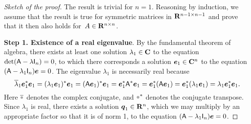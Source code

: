 \begin{proof}
    [Sketch of the proof]
    The result is trivial for $n = 1$.
    Reasoning by induction,
    we assume that the result is true for symmetric matrices in $\mathbf R^{n-1 \times n-1}$
    and prove that it then also holds for~$A \in \mathbf R^{n \times n}$.

            \vspace{.3cm}
            \textbf{Step 1. Existence of a real eigenvalue}.
            By the fundamental theorem of algebra,
            there exists at least one solution $\lambda_1 \in \mathbf C$ to the equation $\det(\mathsf A - \lambda \mathsf I_n) = 0$,
            to which there corresponds a solution $\mathbf{\boldsymbol{e}}_1 \in \mathbf C^n$ to the equation $(\mathsf A - \lambda_1 \mathsf I_n) \mathbf{\boldsymbol{e}} = 0$.
            The eigenvalue $\lambda_1$ is necessarily real because
            \[
                \overline \lambda_1 \mathbf{\boldsymbol{e}}_1^* \mathbf{\boldsymbol{e}}_1
                = (\lambda_1 \mathbf{\boldsymbol{e}}_1)^* \mathbf{\boldsymbol{e}}_1
                = (\mathsf A \mathbf{\boldsymbol{e}}_1)^* \mathbf{\boldsymbol{e}}_1
                = \mathbf{\boldsymbol{e}}_1^* \mathsf A^* \mathbf{\boldsymbol{e}}_1
                = \mathbf{\boldsymbol{e}}_1^* (\mathsf A \mathbf{\boldsymbol{e}}_1)
                = \mathbf{\boldsymbol{e}}_1^* (\lambda_1 \mathbf{\boldsymbol{e}}_1)
                = \lambda_1 \mathbf{\boldsymbol{e}}_1^* \mathbf{\boldsymbol{e}}_1.
            \]
            Here $\overline \placeholder$ denotes the complex conjugate,
            and $\placeholder^*$ denotes the conjugate transpose.
            Since $\lambda_1$ is real, there exists a solution $\mathbf{\boldsymbol{q}}_1 \in \mathbf R^n$,
            which we may multiply by an appropriate factor so that
            it is of norm 1,
            to the equation $(\mathsf A - \lambda_1 \mathsf I_n) \mathbf{\boldsymbol{e}} = 0$.


\end{proof}
